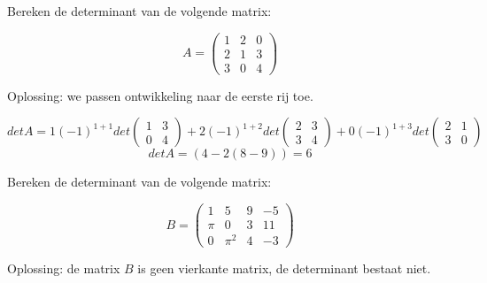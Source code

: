 \begin{voorbeeld}
	Bereken de determinant van de volgende matrix:

\[ A=\left( \begin{matrix}
	1 & 2 & 0 \\
	2 & 1 & 3 \\
	3 & 0 & 4 \end{matrix} \right)
	\]
	
	Oplossing: we passen ontwikkeling naar de eerste rij toe.
	
	\[
	det A= 1 (-1)^{1+1} det \left( \begin{matrix} 
	1 & 3 \\ 0 & 4 \end{matrix} \right) + 2 (-1)^{1+2} det \left( \begin{matrix}
	2 & 3 \\ 3 & 4 \end{matrix} \right) + 0 (-1)^{1+3} det \left( \begin{matrix}
	2 & 1 \\ 3 & 0 \end{matrix} \right)
	\]
	\[ det A=(4-2(8-9))=6 \] 

\end{voorbeeld}	
\begin{voorbeeld}
	Bereken de determinant van de volgende matrix:

	 \[ B=\left( \begin{matrix}
	1 & 5 & 9 & -5 \\
	\pi & 0 & 3 & 11 \\
	0 & \pi^2 & 4 & -3
	\end{matrix} \right)
	\]
	
	Oplossing: de matrix $B$ is geen vierkante matrix, de determinant bestaat niet.
\end{voorbeeld}	

